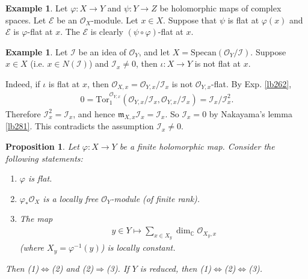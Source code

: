 \documentclass[12pt,b5paper,notitlepage]{report}
\theoremstyle{definition}
\newtheorem{eg}[df]{Example}
\theoremstyle{plain}
\newtheorem{pp}[df]{Proposition}
\newcommand{\mc}{\mathcal}
\newcommand{\scr}{\mathscr}
\newcommand{\Cbb}{\mathbb C}
\newcommand{\Specan}{\mathrm{Specan}}
\newcommand{\Tor}{\mathrm{Tor}}
\newcommand{\mk}{\mathfrak m}
\numberwithin{equation}{section}
\begin{document}
\begin{eg}
Let $\varphi:X\rightarrow Y$ and $\psi:Y\rightarrow Z$ be holomorphic maps of complex spaces. Let $\scr E$ be an $\scr O_X$-module. Let $x\in X$. Suppose that $\psi$ is flat at $\varphi(x)$ and $\scr E$ is $\varphi$-flat at $x$. The $\scr E$ is clearly $(\psi\circ\varphi)$-flat at $x$.
\end{eg}


\begin{eg}
Let $\mc I$ be an idea of $\scr O_Y$, and let $X=\Specan(\scr O_Y/\mc I)$. Suppose $x\in X$ (i.e. $x\in N(\mc I)$) and $\mc I_x\neq 0$, then $\iota:X\rightarrow Y$ is not flat at $x$.

Indeed, if $\iota$ is flat at $x$, then $\scr O_{X,x}=\scr O_{Y,x}/\mc I_x$ is not $\scr O_{Y,x}$-flat. By Exp. \ref{lb262},
\begin{align*}
0=\Tor^{\scr O_{Y,x}}_1(\scr O_{Y,x}/\mc I_x,\scr O_{Y,x}/\mc I_x)=\mc I_x/\mc I_x^2.
\end{align*}
Therefore $\mc I_x^2=\mc I_x$, and hence $\mk _{X,x}\mc I_x=\mc I_x$. So $\mc I_x=0$ by Nakayama's lemma \ref{lb281}. This contradicts the assumption $\mc I_x\neq0$. \hfill\qedsymbol
\end{eg}



\begin{pp}\label{lb368}
Let $\varphi:X\rightarrow Y$ be a finite holomorphic map. Consider the following statements:
\begin{enumerate}[label=(\arabic*)]
\item $\varphi$ is flat.
\item $\varphi_*\scr O_X$ is a locally free $\scr O_Y$-module (of finite rank).
\item The map
\begin{align}
y\in Y\mapsto\sum_{x\in X_y}\dim_\Cbb \scr O_{X_y,x} \label{eq190}
\end{align}
(where $X_y=\varphi^{-1}(y)$) is locally constant.
\end{enumerate}
Then (1)$\Leftrightarrow$(2) and (2)$\Rightarrow$(3). If $Y$ is reduced, then (1)$\Leftrightarrow$(2)$\Leftrightarrow$(3).
\end{pp}
\end{document}
